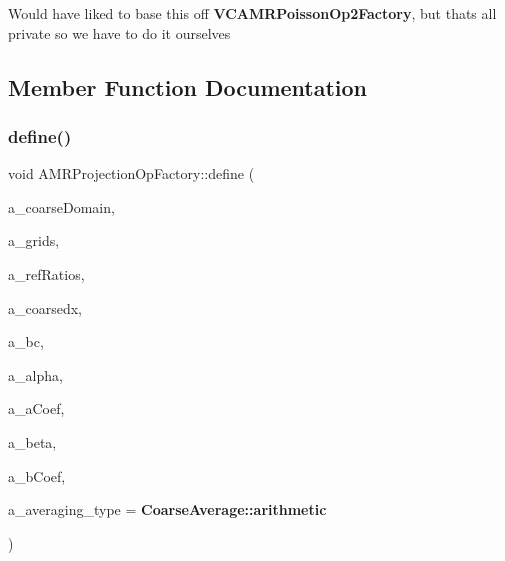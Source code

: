 Would have liked to base this off \textbf{ V\+C\+A\+M\+R\+Poisson\+Op2\+Factory}, but that\textquotesingle{}s all private so we have to do it ourselves 

\subsection{Member Function Documentation}
\mbox{\label{class_a_m_r_projection_op_factory_a826d78ce1993a87c0a5e69268494ae12}} 
\subsubsection{\texorpdfstring{define()}{define()}\hspace{0.1cm}{\footnotesize\ttfamily [1/2]}}
{\footnotesize\ttfamily void A\+M\+R\+Projection\+Op\+Factory\+::define (\begin{DoxyParamCaption}\item[{const \textbf{ Problem\+Domain} \&}]{a\+\_\+coarse\+Domain,  }\item[{const \textbf{ Vector}$<$ \textbf{ Disjoint\+Box\+Layout} $>$ \&}]{a\+\_\+grids,  }\item[{const \textbf{ Vector}$<$ int $>$ \&}]{a\+\_\+ref\+Ratios,  }\item[{const \textbf{ Real} \&}]{a\+\_\+coarsedx,  }\item[{\textbf{ B\+C\+Holder}}]{a\+\_\+bc,  }\item[{const \textbf{ Real} \&}]{a\+\_\+alpha,  }\item[{\textbf{ Vector}$<$ \textbf{ Ref\+Counted\+Ptr}$<$ \textbf{ Level\+Data}$<$ \textbf{ F\+Array\+Box} $>$ $>$ $>$ \&}]{a\+\_\+a\+Coef,  }\item[{const \textbf{ Real} \&}]{a\+\_\+beta,  }\item[{\textbf{ Vector}$<$ \textbf{ Ref\+Counted\+Ptr}$<$ \textbf{ Level\+Data}$<$ \textbf{ Flux\+Box} $>$ $>$ $>$ \&}]{a\+\_\+b\+Coef,  }\item[{int}]{a\+\_\+averaging\+\_\+type = {\ttfamily \textbf{ Coarse\+Average\+::arithmetic}} }\end{DoxyParamCaption})}

